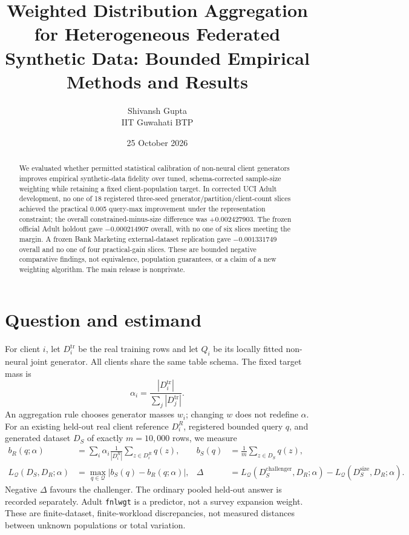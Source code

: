 \documentclass[11pt,a4paper]{article}
\title{Weighted Distribution Aggregation for Heterogeneous Federated Synthetic Data: Bounded Empirical Methods and Results}
\author{Shivansh Gupta\\IIT Guwahati BTP}
\date{25 October 2026}
\begin{document}
\maketitle

\begin{abstract}
We evaluated whether permitted statistical calibration of non-neural client generators improves empirical synthetic-data fidelity over tuned, schema-corrected sample-size weighting while retaining a fixed client-population target. In corrected UCI Adult development, no one of 18 registered three-seed generator/partition/client-count slices achieved the practical 0.005 query-max improvement under the representation constraint; the overall constrained-minus-size difference was $+0.002427903$. The frozen official Adult holdout gave $-0.000214907$ overall, with no one of six slices meeting the margin. A frozen Bank Marketing external-dataset replication gave $-0.001331749$ overall and no one of four practical-gain slices. These are bounded negative comparative findings, not equivalence, population guarantees, or a claim of a new weighting algorithm. The main release is nonprivate.
\end{abstract}

\section{Question and estimand}
For client $i$, let $D_i^{\mathrm{tr}}$ be the real training rows and let $Q_i$ be its locally fitted non-neural joint generator. All clients share the same table schema. The fixed target mass is
\begin{equation}
\alpha_i=\frac{|D_i^{\mathrm{tr}}|}{\sum_j |D_j^{\mathrm{tr}}|}.
\end{equation}
An aggregation rule chooses generator masses $w_i$; changing $w$ does not redefine $\alpha$. For an existing held-out real client reference $D_i^R$, registered bounded query $q$, and generated dataset $D_S$ of exactly $m=10{,}000$ rows, we measure
\begin{align}
b_R(q;\alpha)&=\sum_i\alpha_i\frac{1}{|D_i^R|}\sum_{z\in D_i^R}q(z), &
b_S(q)&=\frac{1}{m}\sum_{z\in D_S}q(z),\\
L_{\mathcal Q}(D_S,D_R;\alpha)&=\max_{q\in\mathcal Q}|b_S(q)-b_R(q;\alpha)|, &
\Delta&=L_{\mathcal Q}(D_S^{\mathrm{challenger}},D_R;\alpha)-L_{\mathcal Q}(D_S^{\mathrm{size}},D_R;\alpha).
\end{align}
Negative $\Delta$ favours the challenger. The ordinary pooled held-out answer is recorded separately. Adult \texttt{fnlwgt} is a predictor, not a survey expansion weight. These are finite-dataset, finite-workload discrepancies, not measured distances between unknown populations or total variation.
\end{document}
